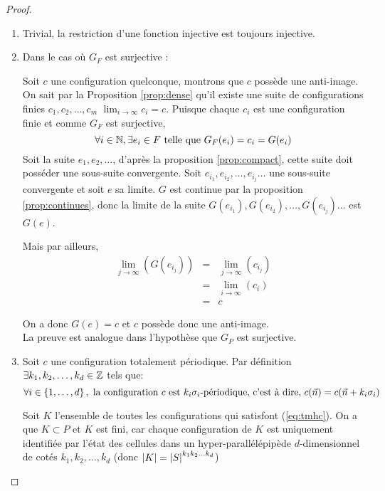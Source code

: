 \begin{proof}

	\begin{enumerate}
		\item Trivial, la restriction d'une fonction injective est toujours injective.
		\item Dans le cas où $G_F$ est surjective :

		      Soit $c$ une configuration quelconque, montrons que $c$ possède une anti-image.
		      On sait par la Proposition \ref{prop:dense} qu'il existe
		      une suite de configurations finies $c_1, c_2, \ldots , c_m$ \tlq $\lim_{i \to \infty} c_i = c$.
		      Puisque chaque $c_i$ est une configuration finie et comme $G_F$ est surjective,
		      $$\forall i\in \mathbb{N},  \exists e_i \in F \mbox{ telle que } G_F(e_i) = c_i = G(e_i)$$
		      Soit la suite $e_1, e_2, \ldots $, d'après la proposition  \ref{prop:compact},
		      cette suite doit posséder une  sous-suite convergente. Soit $ e_{i_1}, e_{i_2}, \ldots , e_{i_j} \ldots$ une
		      sous-suite convergente et soit  $e$ sa limite.
		      $G$ est continue par la proposition \ref{prop:continues}, donc la limite de la suite
		      $G(e_{i_1}), G(e_{i_2}), \ldots , G(e_{i_j}) \ldots$ est   $G(e)$.

		      Mais par ailleurs,
		      \begin{eqnarray*}
			      \lim_{j \to \infty} (G(e_{i_j})) &=& \lim_{j \to \infty} (c_{i_j}) \\
			      &=& \lim_{i \to \infty} (c_i) \\
			      &=& c
		      \end{eqnarray*}

		      On a donc $G(e) = c$ et $c$ possède donc une anti-image.\\
		      La preuve est analogue dans l'hypothèse que $G_P$ est surjective.
		\item Soit $c$ une configuration totalement périodique. Par définition
		      $\exists k_1, k_2, \ldots, k_d \in \mathbb{Z}$ tels que:
		      \begin{equation}
			      \forall i \in \left\{1,\ldots,d\right\}, \ \text{la configuration }  c \text{ est } {k_i}\sigma_i\text{-périodique,}
			      \text{ c'est à dire, }
			      c(\vec n) = c(\vec n +  k_i \sigma_i)
			      \label{eq:tmhc}
		      \end{equation}

		      Soit $K$ l'ensemble de toutes les configurations qui satisfont (\ref{eq:tmhc}). On a que $K \subset P$ et $K$ est fini,
		      car chaque configuration de $K$ est uniquement identifiée par l'état des cellules dans un
		      hyper-parallélépipède $d$-dimensionnel de cotés $k_1, k_2, \ldots, k_d$
		      (donc $\left|K\right| = {\left|S\right|}^{k_1k_2\ldots k_d}$)


\end{enumerate}
\end{proof}
